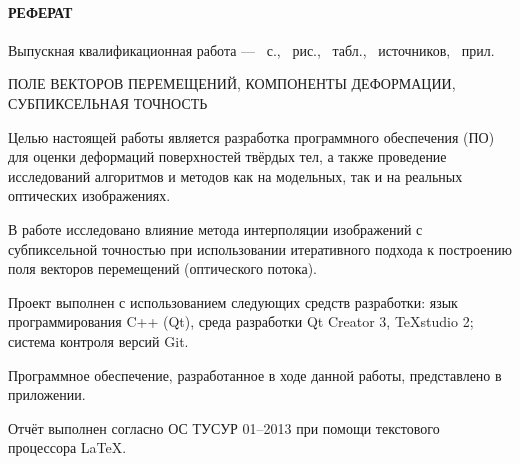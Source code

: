 \newpage
{}
\paragraph{\hfill РЕФЕРАТ \hfill}
Выпускная квалификационная работа --- ~с., ~рис., ~табл., ~источников, ~прил.


ПОЛЕ ВЕКТОРОВ ПЕРЕМЕЩЕНИЙ, КОМПОНЕНТЫ ДЕФОРМАЦИИ, СУБПИКСЕЛЬНАЯ ТОЧНОСТЬ

Целью настоящей работы является разработка программного обеспечения (ПО) для оценки деформаций поверхностей твёрдых тел, а также проведение исследований алгоритмов и методов как на модельных, так и на реальных оптических изображениях.

В работе исследовано влияние метода интерполяции изображений с субпиксельной точностью при использовании итеративного подхода к построению поля векторов перемещений (оптического потока).

Проект выполнен с использованием следующих средств разработки: язык программирования C++ (Qt), среда разработки Qt Creator 3, TeXstudio 2; система контроля версий Git.

Программное обеспечение, разработанное в ходе данной работы, представлено в приложении.

Отчёт выполнен согласно ОС ТУСУР 01--2013 при помощи текстового процессора \LaTeX.
